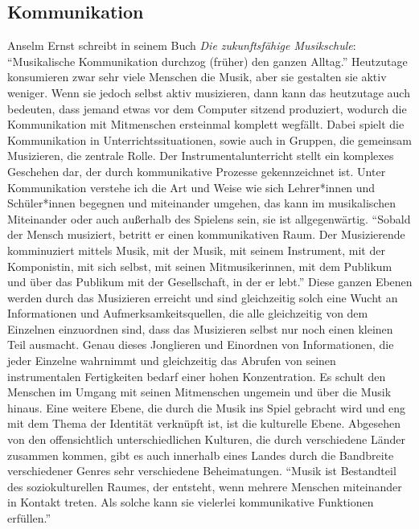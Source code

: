 \subsection{Kommunikation}
Anselm Ernst schreibt in seinem Buch \emph{Die zukunftsfähige Musikschule}:
\enquote{Musikalische Kommunikation durchzog (früher) den ganzen Alltag.}
\autocite[37]{ernst:die_zukunftsfaehige_musikschule} Heutzutage konsumieren zwar
sehr viele Menschen die Musik, aber sie gestalten sie aktiv weniger. Wenn sie
jedoch selbst aktiv musizieren, dann kann das heutzutage auch bedeuten, dass
jemand etwas vor dem Computer sitzend produziert, wodurch die Kommunikation mit
Mitmenschen ersteinmal komplett wegfällt. Dabei spielt die Kommunikation in
Unterrichtssituationen, sowie auch in Gruppen, die gemeinsam Musizieren, die
zentrale Rolle. Der Instrumentalunterricht stellt ein komplexes Geschehen dar,
der durch kommunikative Prozesse gekennzeichnet ist. Unter Kommunikation
verstehe ich die Art und Weise wie sich Lehrer*innen und Schüler*innen begegnen und
miteinander umgehen, das kann im musikalischen Miteinander oder auch außerhalb
des Spielens sein, sie ist allgegenwärtig. \enquote{Sobald der Mensch musiziert, betritt
er einen kommunikativen Raum. Der Musizierende komminuziert mittels Musik, mit
der Musik, mit seinem Instrument, mit der Komponistin, mit sich selbst, mit
seinen Mitmusikerinnen, mit dem Publikum und über das Publikum mit der Gesellschaft,
in der er lebt.} \autocite[56]{doerne:umfassend_musizieren} Diese ganzen Ebenen
werden durch das Musizieren erreicht und sind gleichzeitig solch eine Wucht an
Informationen und Aufmerksamkeitsquellen, die alle gleichzeitig von dem Einzelnen einzuordnen sind, dass
das Musizieren selbst nur noch einen kleinen Teil ausmacht. Genau dieses
Jonglieren und Einordnen von Informationen, die jeder Einzelne wahrnimmt und
gleichzeitig das Abrufen von seinen instrumentalen Fertigkeiten bedarf einer
hohen Konzentration. Es schult den Menschen im Umgang mit seinen Mitmenschen
ungemein und über die Musik hinaus. Eine weitere Ebene, die durch die Musik ins
Spiel gebracht wird und eng mit dem Thema der Identität verknüpft ist, ist die
kulturelle Ebene. Abgesehen von den offensichtlich unterschiedlichen Kulturen,
die durch verschiedene Länder zusammen kommen, gibt es auch innerhalb eines
Landes durch die Bandbreite verschiedener Genres sehr verschiedene
Beheimatungen. \enquote{Musik ist Bestandteil des soziokulturellen Raumes, der entsteht,
wenn mehrere Menschen miteinander in Kontakt treten. Als solche kann sie
vielerlei kommunikative Funktionen erfüllen.}
